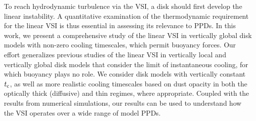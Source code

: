 \documentclass[iop, numberedappendix]{emulateapj}
\begin{document}
To reach hydrodynamic turbulence via the VSI, a disk should  
first develop the linear instability. A quantitative 
examination of the thermodynamic requirement for the linear VSI is
thus essential in assessing its 
relevance to PPDs. In this work, we present a
comprehensive study of the linear VSI in vertically global disk models 
with non-zero cooling timescales, which permit buoyancy forces. 
Our effort generalizes previous studies of the linear VSI in 
vertically local \citep{urpin98,urpin03} and vertically global 
 disk models that consider the limit
of instantaneous cooling, for which buoyancy plays no role.  
We consider disk  
models with vertically constant $t_{\rm c}$, as well as more realistic
cooling timescales based on dust opacity in both the optically thick
(diffusive) and thin regimes, where appropriate. Coupled with the 
results from numerical simulations, our results can be used to 
understand how the VSI operates over a wide range of model PPDs. 

\end{document}
